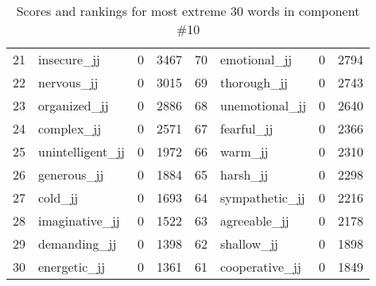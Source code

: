 \begin{table}[tbp]
\begin{tabular}{| rlr@{.}l | rlr@{.}l |}
    21 & insecure\_jj & 0 & 3467    &    70 & emotional\_jj & 0 & 2794 \\
    22 & nervous\_jj & 0 & 3015    &    69 & thorough\_jj & 0 & 2743 \\
    23 & organized\_jj & 0 & 2886    &    68 & unemotional\_jj & 0 & 2640 \\
    24 & complex\_jj & 0 & 2571    &    67 & fearful\_jj & 0 & 2366 \\
    25 & unintelligent\_jj & 0 & 1972    &    66 & warm\_jj & 0 & 2310 \\
    26 & generous\_jj & 0 & 1884    &    65 & harsh\_jj & 0 & 2298 \\
    27 & cold\_jj & 0 & 1693    &    64 & sympathetic\_jj & 0 & 2216 \\
    28 & imaginative\_jj & 0 & 1522    &    63 & agreeable\_jj & 0 & 2178 \\
    29 & demanding\_jj & 0 & 1398    &    62 & shallow\_jj & 0 & 1898 \\
    30 & energetic\_jj & 0 & 1361    &    61 & cooperative\_jj & 0 & 1849 \\
    \hline
    \end{tabular}
    \caption{Scores and rankings for most extreme 30 words in component \#10} 
\end{table}
\clearpage
